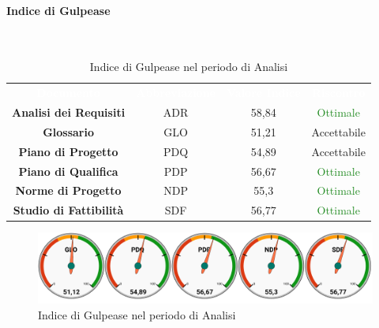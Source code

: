 \paragraph{Indice di Gulpease}\mbox{}\\[0,3cm]
\begin{table}[H]
	\centering
	\begin{tabular}{cccc}
	\rowcolor{greySWEight}
	\textcolor{white}{\textbf{Documento}} & 
	\textcolor{white}{\textbf{Abbreviazione}} &
	\textcolor{white}{\textbf{Valore Indice}}&
	\textcolor{white}{\textbf{Riscontro}}\\
	
	\textbf{Analisi dei Requisiti} & ADR & 58,84 & \textcolor{ForestGreen}{Ottimale} \\
	\textbf{Glossario} & GLO & 51,21 & \textcolor{YellowOrange}{Accettabile} \\
	\textbf{Piano di Progetto} & PDQ & 54,89 & \textcolor{YellowOrange}{Accettabile} \\
	\textbf{Piano di Qualifica} & PDP & 56,67 & \textcolor{ForestGreen}{Ottimale} \\
	\textbf{Norme di Progetto} & NDP & 55,3 & \textcolor{ForestGreen}{Ottimale} \\
	\textbf{Studio di Fattibilità} & SDF & 56,77 & \textcolor{ForestGreen}{Ottimale} \\

	\end{tabular}
	\caption{Indice di Gulpease nel periodo di Analisi}
\end{table}
\begin{figure}[H]
	\includegraphics[width=1\linewidth]{sez/App_Esito/graph/AN_Gulp.pdf}
	\caption{Indice di Gulpease nel periodo di Analisi}
\end{figure}

